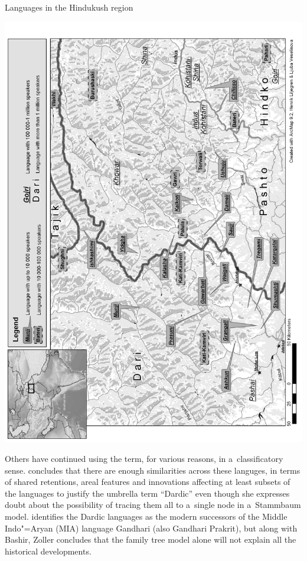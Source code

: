 \begin{mapfigure}[p!]
\caption{Languages in the Hindukush region}
\includegraphics[width=\textwidth]{figures/ch1map2.png}
\label{map:1-2}
\end{mapfigure}

Others have continued using the term, for various reasons, in a~classificatory sense. \citet[822]{bashir2003} concludes that there are enough similarities across these languges, in terms of shared retentions, areal features and innovations affecting at least subsets of the languages to justify the umbrella term ``Dardic'' even though she expresses doubt about the possibility of tracing them all to a~single node in a~Stammbaum model. \citet[10--11]{zoller2005} identifies the Dardic languages as the modern successors of the Middle Indo"=Aryan (MIA) language Gandhari (also Gandhari Prakrit), but along with Bashir, Zoller concludes that the family tree model alone will not explain all the historical developments. 


